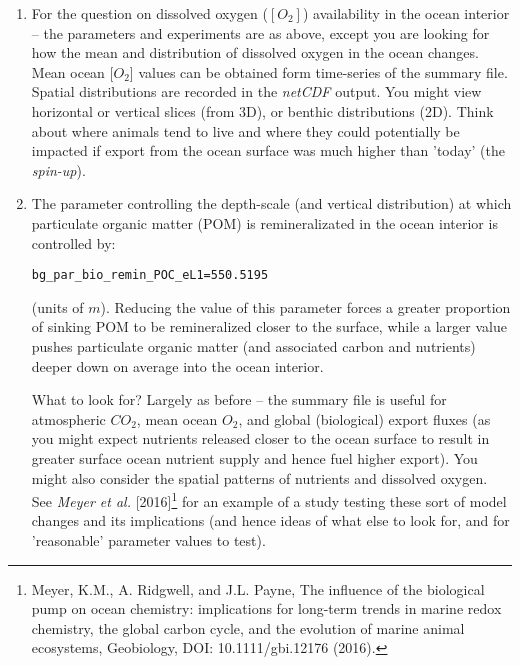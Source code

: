 \begin{enumerate}[noitemsep]
\vspace{1mm}
\item For the question on dissolved oxygen (\([O_{2}]\)) availability in the ocean interior -- the parameters and experiments are as above, except you are looking for how the mean and distribution of dissolved oxygen in the ocean changes. Mean ocean [\(O_{2}\)] values can be obtained form time-series of the summary file. Spatial distributions are recorded in the \textit{netCDF} output. You might view horizontal or vertical slices (from 3D), or benthic distributions (2D). Think about where animals tend to live and where they could potentially be impacted if export from the ocean surface was much higher than 'today' (the \textit{spin-up}).

\vspace{1mm}
\item The parameter controlling the depth-scale (and vertical distribution) at which particulate organic matter (POM) is remineralizated in the ocean interior is controlled by:
\vspace{-1pt}\small\begin{verbatim}
bg_par_bio_remin_POC_eL1=550.5195
\end{verbatim}\normalsize\vspace{-1pt}
(units of \(m\)). Reducing the value of this parameter forces a greater proportion of sinking POM to be remineralized closer to the surface, while a larger value pushes particulate organic matter  (and associated carbon and nutrients) deeper down on average into the ocean interior.

%
\noindent What to look for? Largely as before -- the summary file is useful for atmospheric \(CO_{2}\), mean ocean {\(O_{2}\)}, and global (biological) export fluxes (as you might expect nutrients released closer to the ocean surface to result in greater surface ocean nutrient supply and hence fuel higher export). You might also consider the spatial patterns of nutrients and dissolved oxygen.
\\See \textit{Meyer et al.} [2016]\footnote{Meyer, K.M., A. Ridgwell, and J.L. Payne, The influence of the biological pump on ocean chemistry: implications for long-term trends in marine redox chemistry, the global carbon cycle, and the evolution of marine animal ecosystems, Geobiology, DOI: 10.1111/gbi.12176 (2016).} for an example of a study testing these sort of model changes and its implications (and hence ideas of what else to look for, and for 'reasonable' parameter values to test).


\end{enumerate}
